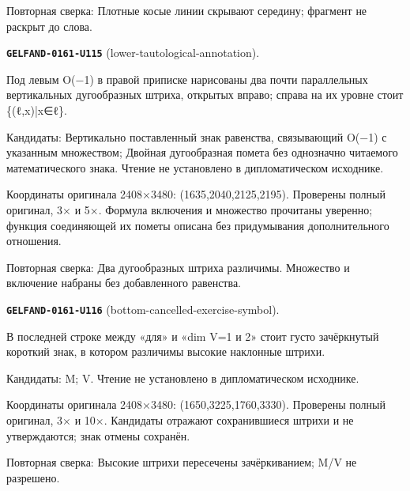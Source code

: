 Повторная сверка: Плотные косые линии скрывают середину; фрагмент не раскрыт до слова.\par\medskip
\par\noindent\leavevmode{}\label{GELFAND-0161-U115}\label{GELFAND-P001488:lower-tautological-annotation}\textbf{\texttt{GELFAND-0161-U115}} (lower-tautological-annotation).\nopagebreak[4]\par
Под левым O(−1) в правой приписке нарисованы два почти параллельных вертикальных дугообразных штриха, открытых вправо; справа на их уровне стоит \{(ℓ,x)|x∈ℓ\}.\par
Кандидаты: Вертикально поставленный знак равенства, связывающий O(−1) с указанным множеством; Двойная дугообразная помета без однозначно читаемого математического знака. Чтение не установлено в дипломатическом исходнике.\par
Координаты оригинала 2408×3480: (1635,2040,2125,2195). Проверены полный оригинал, 3× и 5×. Формула включения и множество прочитаны уверенно; функция соединяющей их пометы описана без придумывания дополнительного отношения.\par
Повторная сверка: Два дугообразных штриха различимы. Множество и включение набраны без добавленного равенства.\par\medskip
\par\noindent\leavevmode{}\label{GELFAND-0161-U116}\label{GELFAND-P001488:bottom-cancelled-exercise-symbol}\textbf{\texttt{GELFAND-0161-U116}} (bottom-cancelled-exercise-symbol).\nopagebreak[4]\par
В последней строке между «для» и «dim V=1 и 2» стоит густо зачёркнутый короткий знак, в котором различимы высокие наклонные штрихи.\par
Кандидаты: M; V. Чтение не установлено в дипломатическом исходнике.\par
Координаты оригинала 2408×3480: (1650,3225,1760,3330). Проверены полный оригинал, 3× и 10×. Кандидаты отражают сохранившиеся штрихи и не утверждаются; знак отмены сохранён.\par
Повторная сверка: Высокие штрихи пересечены зачёркиванием; M/V не разрешено.\par\medskip

